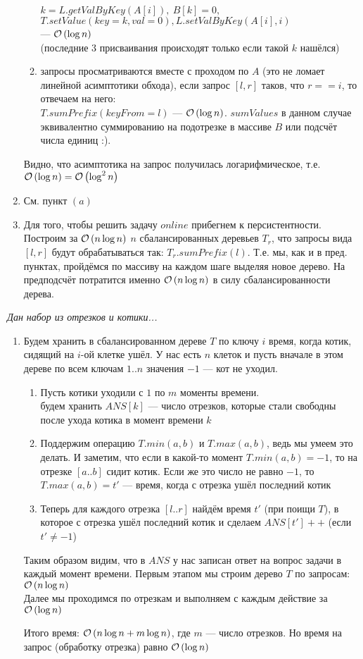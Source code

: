 \begin{enumerate}[label=(\alph*)]
\begin{enumerate}
	$k = L.getValByKey(A[i]),\ B[k] = 0,$\\
	$T.setValue(key=k, val=0), L.setValByKey(A[i], i)$\\
	--- $\mathcal{O}\left(\log{n}\right)$\\
	(последние 3 присваивания происходят только если такой $k$ нашёлся)
	\item запросы просматриваются вместе с проходом по $A$ (это не ломает линейной асимптотики обхода),
	если запрос $[l,r]$ таков, что $r == i$, то отвечаем на него: \\ 
	$T.sumPrefix(keyFrom = l)$ --- $\mathcal{O}\left(\log{n}\right)$.
	$sumValues$ в данном случае эквивалентно суммированию на подотрезке в массиве $B$ или подсчёт числа единиц :).
\end{enumerate}
Видно, что асимптотика на запрос получилась логарифмическое, т.е. $\mathcal{O}\left(\log{n}\right) = \mathcal{O}\left(\log^2{n}\right)$ \xqed
\item См. пункт $(a)$ \xqed
\item Для того, чтобы решить задачу $online$ прибегнем к персистентности. Построим за $\mathcal{O}\left(n\log{n}\right)$
$n$ сбалансированных деревьев $T_r$, что запросы вида $[l,r]$ будут обрабатываться так: $T_r.sumPrefix(l)$.
Т.е. мы, как и в пред. пунктах, пройдёмся по массиву на каждом шаге выделяя новое дерево. На предподсчёт потратится именно $\mathcal{O}\left(n\log{n}\right)$ в силу сбалансированности дерева. \xqed
\end{enumerate}


\textit{Дан набор из отрезков и котики...}
\begin{enumerate}[label=(\alph*)]
\item Будем хранить в сбалансированном дереве $T$ по ключу $i$ время, когда котик, сидящий на $i$-ой клетке ушёл.
У нас есть $n$ клеток и пусть вначале в этом дереве по всем ключам $1..n$ значения $-1$ --- кот не уходил.
\begin{enumerate}[1)]
	\item Пусть котики уходили с $1$ по $m$ моменты времени. 
	\\будем хранить $ANS[k]$ --- число отрезков, которые стали свободны после ухода котика в момент времени $k$
	\item Поддержим операцию $T.min(a, b)$ и $T.max(a,b)$, ведь мы умеем это делать. И заметим, что если в какой-то момент $T.min(a,b) = -1$, то на отрезке $[a..b]$ сидит котик. Если же это число не равно $-1$,
	то $T.max(a,b)=t'$ --- время, когда с отрезка ушёл последний котик
	\item Теперь для каждого отрезка $[l..r]$ найдём время $t'$ (при поищи $T$), в которое с отрезка ушёл последний котик и
	сделаем $ANS[t']++$ (если $t' \neq -1$)
\end{enumerate}
Таким образом видим, что в $ANS$ у нас записан ответ на вопрос задачи в каждый момент времени.
Первым этапом мы строим дерево $T$ по запросам: $\mathcal{O}\left(n\log{n}\right)$\\
Далее мы проходимся по отрезкам и выполняем с каждым действие за $\mathcal{O}\left(\log{n}\right)$

Итого время: $\mathcal{O}\left(n\log{n} + m\log{n}\right)$, где $m$ --- число отрезков.
Но время на запрос (обработку отрезка) равно $\mathcal{O}\left(\log{n}\right)$ \xqed
\end{enumerate}





